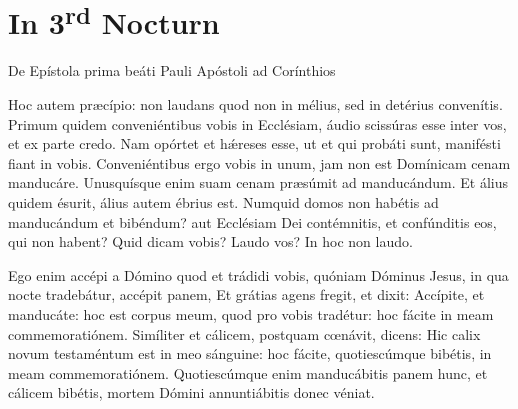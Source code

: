 \section*{In 3\textsuperscript{rd} Nocturn}


    




    De Epístola prima beáti Pauli Apóstoli ad Corínthios


    Hoc autem præcípio: non laudans quod non in mélius, sed in detérius
    convenítis. Primum quidem conveniéntibus vobis in Ecclésiam, áudio
    scissúras esse inter vos, et ex parte credo. Nam opórtet et hǽreses esse,
    ut et qui probáti sunt, manifésti fiant in vobis. Conveniéntibus ergo vobis
    in unum, jam non est Domínicam cenam manducáre. Unusquísque enim suam cenam
    præsúmit ad manducándum. Et álius quidem ésurit, álius autem ébrius est.
    Numquid domos non habétis ad manducándum et bibéndum? aut Ecclésiam Dei
    contémnitis, et confúnditis eos, qui non habent? Quid dicam vobis? Laudo
    vos? In hoc non laudo.




    Ego enim accépi a Dómino quod et trádidi vobis, quóniam Dóminus Jesus, in qua
    nocte tradebátur, accépit panem, Et grátias agens fregit, et dixit: Accípite,
    et manducáte: hoc est corpus meum, quod pro vobis tradétur: hoc fácite in meam
    commemoratiónem. Simíliter et cálicem, postquam cœnávit, dicens: Hic calix
    novum testaméntum est in meo sánguine: hoc fácite, quotiescúmque bibétis, in
    meam commemoratiónem. Quotiescúmque enim manducábitis panem hunc, et cálicem
    bibétis, mortem Dómini annuntiábitis donec véniat.



